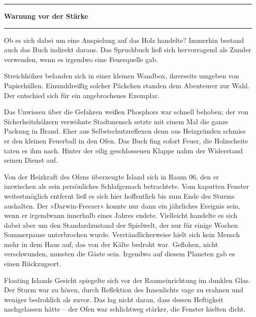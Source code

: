 \noindent \parbox{\textwidth}{ \vspace{3ex} \hrule \vspace{3ex}

\textbf{Warnung vor der Stärke}


\vspace{3ex} \hrule \vspace{3ex} }

Ob es sich dabei um eine Anspielung auf das Holz handelte? Immerhin bestand auch das Buch indirekt daraus. Das Spruchbuch ließ sich hervorragend als Zunder verwenden, wenn es irgendwo eine Feuerquelle gab.

Streichhölzer befanden sich in einer kleinen Wandbox, ihrerseits umgeben von Papierhüllen. Einunddreißig solcher Päckchen standen dem Abenteurer zur Wahl. Der entschied sich für ein angebrochenes Exemplar.

Das Unwissen über die Gefahren weißen Phosphors war schnell behoben; der von Sicherheitshölzern verwöhnte Stadtmensch setzte mit einem Mal die ganze Packung in Brand. Eher aus Selbstschutzreflexen denn aus Heizgründen schmiss er den kleinen Feuerball in den Ofen. Das Buch fing sofort Feuer, die Holzscheite taten es ihm nach. Hinter der eilig geschlossenen Klappe nahm der Widerstand seinen Dienst auf.

Von der Heizkraft des Ofens überzeugte Island sich in Raum 06, den er inzwischen als sein persönliches Schlafgemach betrachtete. Vom kaputten Fenster weitestmöglich entfernt ließ es sich hier hoffentlich bis zum Ende des Sturms aushalten. Der »Darwin-Freezer« konnte nur dann ein jährliches Ereignis sein, wenn er irgendwann innerhalb eines Jahres endete. Vielleicht handelte es sich dabei aber um den Standardzustand der Spielwelt, der nur für einige Wochen Sommerpause unterbrochen wurde. Verständlicherweise hielt sich kein Mensch mehr in dem Haus auf, das von der Kälte bedroht war. Geflohen, nicht verschwunden, mussten die Gäste sein. Irgendwo auf diesem Planeten gab es einen Rückzugsort.

Floating Islands Gesicht spiegelte sich vor der Raumeinrichtung im dunklen Glas. Der Sturm war zu hören, durch Reflektion des Innenlichts vage zu erahnen und weniger bedrohlich als zuvor. Das lag nicht daran, dass dessen Heftigkeit nachgelassen hätte – der Ofen war schlichtweg stärker, die Fenster hielten dicht.

